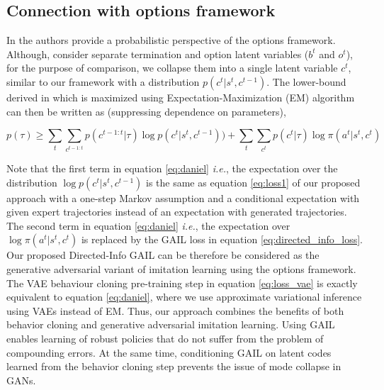 \documentclass{article} %
\begin{document}
\subsection{Connection with options framework}

In \cite{daniel2016probabilistic} the authors provide a probabilistic perspective of the options framework. Although, \cite{daniel2016probabilistic} consider separate termination and option latent variables ($b^t$ and $o^t$), for the purpose of comparison, we collapse them into a single latent variable $c^t$, similar to our framework with a distribution $p(c^t|s^t, c^{t-1})$. The lower-bound derived in \cite{daniel2016probabilistic} which is maximized using Expectation-Maximization (EM) algorithm can then be written as (suppressing dependence on parameters),

\begin{equation}
    p(\tau) \geq \sum_{t} \sum_{c^{t-1:t}} p(c^{t-1:t}|\tau) \log p(c^t|s^t, c^{t-1})) 
    + \sum_{t} \sum_{c^t} p(c^t|\tau) \log \pi(a^t|s^t, c^t)
\label{eq:daniel}
\end{equation}

Note that the first term in equation \ref{eq:daniel} \emph{i.e.}, the expectation over the distribution $\log p(c^t|s^t, c^{t-1})$ is the same as equation \ref{eq:loss1} of our proposed approach with a one-step Markov assumption and a conditional expectation with given expert trajectories instead of an expectation with generated trajectories. The second term in equation \ref{eq:daniel} \emph{i.e.}, the expectation over $\log \pi(a^t|s^t, c^t)$ is replaced by the GAIL loss in equation \ref{eq:directed_info_loss}. Our proposed Directed-Info GAIL can be therefore be considered as the generative adversarial variant of imitation learning using the options framework. The VAE behaviour cloning pre-training step in equation \ref{eq:loss_vae} is exactly equivalent to equation \ref{eq:daniel}, where we use approximate variational inference using VAEs instead of EM. Thus, our approach combines the benefits of both behavior cloning and generative adversarial imitation learning. Using GAIL enables learning of robust policies that do not suffer from the problem of compounding errors. At the same time, conditioning GAIL on latent codes learned from the behavior cloning step prevents the issue of mode collapse in GANs.

\end{document}
